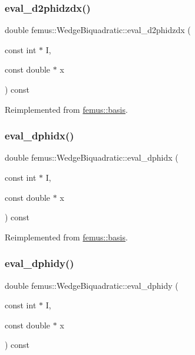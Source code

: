 \subsubsection{\texorpdfstring{eval\+\_\+d2phidzdx()}{eval\_d2phidzdx()}}
{\footnotesize\ttfamily double femus\+::\+Wedge\+Biquadratic\+::eval\+\_\+d2phidzdx (\begin{DoxyParamCaption}\item[{const int $\ast$}]{I,  }\item[{const double $\ast$}]{x }\end{DoxyParamCaption}) const\hspace{0.3cm}{\ttfamily [virtual]}}



Reimplemented from \mbox{\hyperlink{classfemus_1_1basis_a5d619ec5bd57b7d2dc34a99d69975c77}{femus\+::basis}}.

\mbox{\label{classfemus_1_1_wedge_biquadratic_aaa7530531bf1306063e7082aaeb82c4f}} 
\subsubsection{\texorpdfstring{eval\+\_\+dphidx()}{eval\_dphidx()}}
{\footnotesize\ttfamily double femus\+::\+Wedge\+Biquadratic\+::eval\+\_\+dphidx (\begin{DoxyParamCaption}\item[{const int $\ast$}]{I,  }\item[{const double $\ast$}]{x }\end{DoxyParamCaption}) const\hspace{0.3cm}{\ttfamily [virtual]}}



Reimplemented from \mbox{\hyperlink{classfemus_1_1basis_a4db7d29cf8a753ddbccc4a297dafa0bf}{femus\+::basis}}.

\mbox{\label{classfemus_1_1_wedge_biquadratic_aae739c976101ce3475bcef7ac9927b19}} 
\subsubsection{\texorpdfstring{eval\+\_\+dphidy()}{eval\_dphidy()}}
{\footnotesize\ttfamily double femus\+::\+Wedge\+Biquadratic\+::eval\+\_\+dphidy (\begin{DoxyParamCaption}\item[{const int $\ast$}]{I,  }\item[{const double $\ast$}]{x }\end{DoxyParamCaption}) const\hspace{0.3cm}{\ttfamily [virtual]}}



